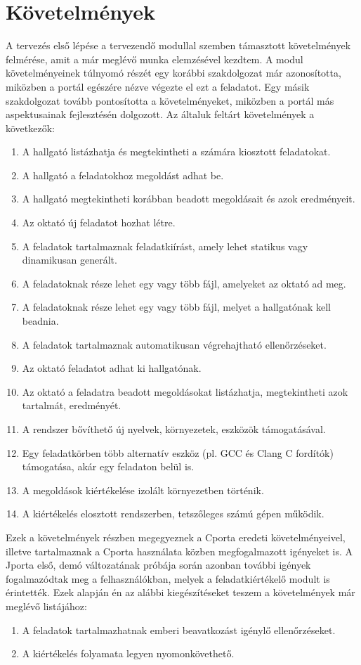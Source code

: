 \section{Követelmények}\label{section:requirements}
A tervezés első lépése a tervezendő modullal szemben támasztott követelmények felmérése, amit a már meglévő munka elemzésével kezdtem.
A modul követelményeinek túlnyomó részét egy korábbi szakdolgozat \cite{Ory13} már azonosította, miközben a portál egészére nézve végezte el ezt a feladatot.
Egy másik szakdolgozat \cite{Kalman14} tovább pontosította a követelményeket, miközben a portál más aspektusainak fejlesztésén dolgozott.
Az általuk feltárt követelmények a következők:
\begin{enumerate}
    \item A hallgató listázhatja és megtekintheti a számára kiosztott feladatokat.
    \item A hallgató a feladatokhoz megoldást adhat be.
    \item A hallgató megtekintheti korábban beadott megoldásait és azok eredményeit.
    \item Az oktató új feladatot hozhat létre.
    \item \label{req:specification} A feladatok tartalmaznak feladatkiírást, amely lehet statikus vagy dinamikusan generált.
    \item A feladatoknak része lehet egy vagy több fájl, amelyeket az oktató ad meg.
    \item A feladatoknak része lehet egy vagy több fájl, melyet a hallgatónak kell beadnia.
    \item A feladatok tartalmaznak automatikusan végrehajtható ellenőrzéseket.
    \item Az oktató feladatot adhat ki hallgatónak.
    \item Az oktató a feladatra beadott megoldásokat listázhatja, megtekintheti azok tartalmát, eredményét.
    \item A rendszer bővíthető új nyelvek, környezetek, eszközök támogatásával.
    \item Egy feladatkörben több alternatív eszköz (pl. GCC és Clang C fordítók) támogatása, akár egy feladaton belül is.
    \item \label{req:isolation} A megoldások kiértékelése izolált környezetben történik.
    \item \label{req:distributed} A kiértékelés elosztott rendszerben, tetszőleges számú gépen működik.
\end{enumerate}
Ezek a követelmények részben megegyeznek a Cporta eredeti követelményeivel, illetve tartalmaznak a Cporta használata közben megfogalmazott igényeket is.
A Jporta első, demó változatának próbája során azonban további igények fogalmazódtak meg a felhasználókban, melyek a feladatkiértékelő modult is érintették.
Ezek alapján én az alábbi kiegészítéseket teszem a követelmények már meglévő listájához:
\begin{enumerate}[resume]
    \item \label{req:manual} A feladatok tartalmazhatnak emberi beavatkozást igénylő ellenőrzéseket.
    \item \label{req:traceability} A kiértékelés folyamata legyen nyomonkövethető.
\end{enumerate}

